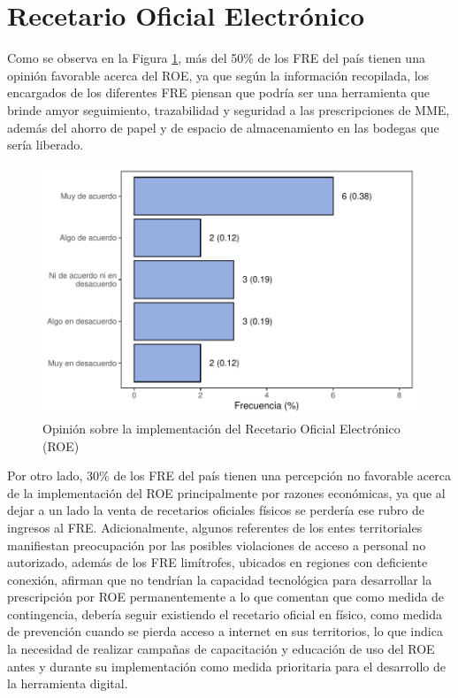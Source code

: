 \documentclass[
]{book}
\begin{document}
\hypertarget{recetario-oficial-electruxf3nico}{%
\section{Recetario Oficial Electrónico}\label{recetario-oficial-electruxf3nico}}

Como se observa en la Figura \ref{fig:FREImplementacionROE}, más del 50\% de los FRE del país tienen una opinión favorable acerca del ROE, ya que según la información recopilada, los encargados de los diferentes FRE piensan que podría ser una herramienta que brinde amyor seguimiento, trazabilidad y seguridad a las prescripciones de MME, además del ahorro de papel y de espacio de almacenamiento en las bodegas que sería liberado.

\begin{figure}
\includegraphics[width=0.85\linewidth]{InformeFinal_files/figure-latex/FREImplementacionROE-1} \caption{Opinión sobre la implementación del Recetario Oficial Electrónico (ROE)}\label{fig:FREImplementacionROE}
\end{figure}

Por otro lado, 30\% de los FRE del país tienen una percepción no favorable acerca de la implementación del ROE principalmente por razones económicas, ya que al dejar a un lado la venta de recetarios oficiales físicos se perdería ese rubro de ingresos al FRE. Adicionalmente, algunos referentes de los entes territoriales manifiestan preocupación por las posibles violaciones de acceso a personal no autorizado, además de los FRE limítrofes, ubicados en regiones con deficiente conexión, afirman que no tendrían la capacidad tecnológica para desarrollar la prescripción por ROE permanentemente a lo que comentan que como medida de contingencia, debería seguir existiendo el recetario oficial en físico, como medida de prevención cuando se pierda acceso a internet en sus territorios, lo que indica la necesidad de realizar campañas de capacitación y educación de uso del ROE antes y durante su implementación como medida prioritaria para el desarrollo de la herramienta digital.
\end{document}
